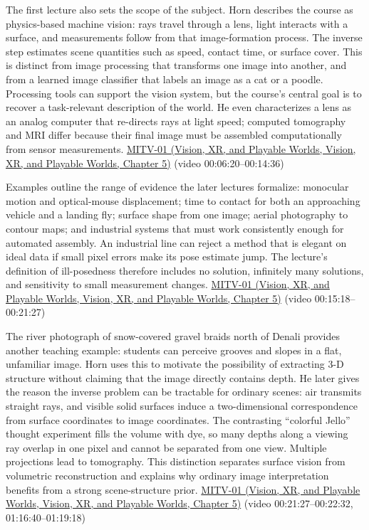 The first lecture also sets the scope of the subject. Horn describes the course as physics-based machine vision: rays travel through a lens, light interacts with a surface, and measurements follow from that image-formation process. The inverse step estimates scene quantities such as speed, contact time, or surface cover. This is distinct from image processing that transforms one image into another, and from a learned image classifier that labels an image as a cat or a poodle. Processing tools can support the vision system, but the course's central goal is to recover a task-relevant description of the world. He even characterizes a lens as an analog computer that re-directs rays at light speed; computed tomography and MRI differ because their final image must be assembled computationally from sensor measurements. \href{../07-Vision-XR-and-Playable-Worlds/main.pdf\#nameddest=04-visual-computing-ii-ch036-mitv-01---introduction-to-machine-vision}{MITV-01 (Vision, XR, and Playable Worlds, Vision, XR, and Playable Worlds, Chapter 5)} (video 00:06:20--00:14:36)

Examples outline the range of evidence the later lectures formalize: monocular motion and optical-mouse displacement; time to contact for both an approaching vehicle and a landing fly; surface shape from one image; aerial photography to contour maps; and industrial systems that must work consistently enough for automated assembly. An industrial line can reject a method that is elegant on ideal data if small pixel errors make its pose estimate jump. The lecture's definition of ill-posedness therefore includes no solution, infinitely many solutions, and sensitivity to small measurement changes. \href{../07-Vision-XR-and-Playable-Worlds/main.pdf\#nameddest=04-visual-computing-ii-ch036-mitv-01---introduction-to-machine-vision}{MITV-01 (Vision, XR, and Playable Worlds, Vision, XR, and Playable Worlds, Chapter 5)} (video 00:15:18--00:21:27)

The river photograph of snow-covered gravel braids north of Denali provides another teaching example: students can perceive grooves and slopes in a flat, unfamiliar image. Horn uses this to motivate the possibility of extracting 3-D structure without claiming that the image directly contains depth. He later gives the reason the inverse problem can be tractable for ordinary scenes: air transmits straight rays, and visible solid surfaces induce a two-dimensional correspondence from surface coordinates to image coordinates. The contrasting ``colorful Jello'' thought experiment fills the volume with dye, so many depths along a viewing ray overlap in one pixel and cannot be separated from one view. Multiple projections lead to tomography. This distinction separates surface vision from volumetric reconstruction and explains why ordinary image interpretation benefits from a strong scene-structure prior. \href{../07-Vision-XR-and-Playable-Worlds/main.pdf\#nameddest=04-visual-computing-ii-ch036-mitv-01---introduction-to-machine-vision}{MITV-01 (Vision, XR, and Playable Worlds, Vision, XR, and Playable Worlds, Chapter 5)} (video 00:21:27--00:22:32, 01:16:40--01:19:18)

